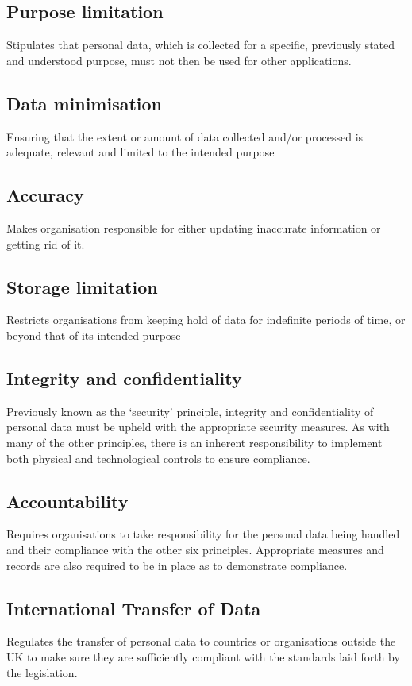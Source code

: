 \documentclass[a4paper,12pt]{article}
\begin{document}
\subsection{Purpose limitation}
Stipulates that personal data, which is collected for a specific, previously stated and understood purpose, must not then be used for other applications. 
\subsection{Data minimisation}
Ensuring that the extent or amount of data collected and/or processed is adequate, relevant and limited to the intended purpose
\subsection{Accuracy}
Makes organisation responsible for either updating inaccurate information or getting rid of it.
\subsection{Storage limitation}
Restricts organisations from keeping hold of data for indefinite periods of time, or beyond that of its intended purpose
\subsection{Integrity and confidentiality}
Previously known as the ‘security’ principle, integrity and confidentiality of personal data must be upheld with the appropriate security measures. As with many of the other principles, there is an inherent responsibility to implement both physical and technological controls to ensure compliance.
\subsection{Accountability}
Requires organisations to take responsibility for the personal data being handled and their compliance with the other six principles. Appropriate measures and records are also required to be in place as to demonstrate compliance.

\subsection{International Transfer of Data}
Regulates the transfer of personal data to countries or organisations outside the UK to make sure they are sufficiently compliant with the standards laid forth by the legislation.
\end{document}
